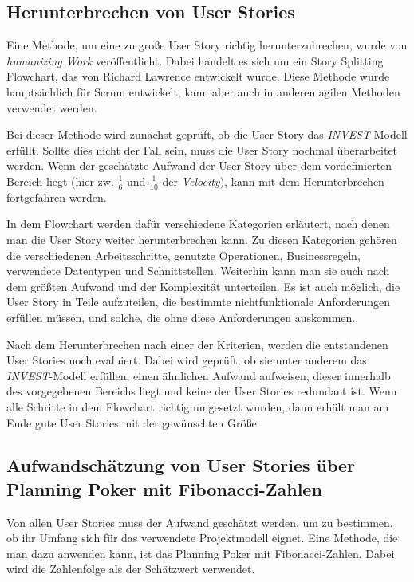 \documentclass[acmtog]{acmart}
\begin{document}
\subsection{Herunterbrechen von User Stories} \label{sec:breakedown}

Eine Methode, um eine zu große User Story richtig herunterzubrechen, wurde von \emph{humanizing Work} veröffentlicht. Dabei handelt es sich um ein Story 
Splitting Flowchart, das von Richard Lawrence entwickelt wurde. Diese Methode wurde hauptsächlich für Scrum entwickelt, kann aber auch 
in anderen agilen Methoden verwendet werden. \cite{humanizingwork}

Bei dieser Methode wird zunächst geprüft, ob die User Story das \emph{INVEST}-Modell erfüllt. Sollte dies nicht der Fall sein, muss die User Story nochmal 
überarbeitet werden. Wenn der geschätzte Aufwand der User Story über dem vordefinierten Bereich liegt (hier zw. \( \frac{1}{6} \) und \( \frac{1}{10} \) der \emph{Velocity}), kann mit dem Herunterbrechen 
fortgefahren werden. \cite{humanizingwork}

In dem Flowchart werden dafür verschiedene Kategorien erläutert, nach denen man die User Story weiter herunterbrechen kann. Zu diesen Kategorien 
gehören die verschiedenen Arbeitsschritte, genutzte Operationen, Businessregeln, verwendete Datentypen und Schnittstellen. Weiterhin kann man sie auch nach dem größten 
Aufwand und der Komplexität unterteilen. Es ist auch möglich, die User Story in Teile aufzuteilen, die bestimmte nichtfunktionale Anforderungen erfüllen müssen, 
und solche, die ohne diese Anforderungen auskommen. \cite{humanizingwork}

Nach dem Herunterbrechen nach einer der Kriterien, werden die entstandenen User Stories noch evaluiert. Dabei wird geprüft, ob sie unter anderem das \emph{INVEST}-Modell erfüllen, einen 
ähnlichen Aufwand aufweisen, dieser innerhalb des vorgegebenen Bereichs liegt und keine der User Stories redundant ist. Wenn alle Schritte in dem Flowchart richtig umgesetzt wurden, 
dann erhält man am Ende gute User Stories mit der gewünschten Größe. \cite{humanizingwork}

\subsection{Aufwandschätzung von User Stories über Planning Poker mit Fibonacci-Zahlen} \label{sec:effort}

Von allen User Stories muss der Aufwand geschätzt werden, um zu bestimmen, ob ihr Umfang sich für das verwendete Projektmodell eignet. 
Eine Methode, die man dazu anwenden kann, ist das Planning Poker mit Fibonacci-Zahlen. Dabei wird die Zahlenfolge als der Schätzwert verwendet. \cite{planingpoker}
\end{document}
